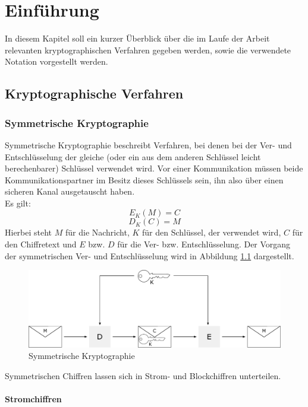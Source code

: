 \chapter{Einführung}

\label{cha_cryptographic_techniques}

In diesem Kapitel soll ein kurzer Überblick über die im Laufe der Arbeit relevanten kryptographischen Verfahren gegeben werden, sowie die verwendete Notation vorgestellt werden.

\section{Kryptographische Verfahren}

\subsection{Symmetrische Kryptographie}

Symmetrische Kryptographie beschreibt Verfahren, bei denen bei der Ver- und Entschlüsselung der gleiche (oder ein aus dem anderen Schlüssel leicht berechenbarer) Schlüssel verwendet wird. Vor einer Kommunikation müssen beide Kommunikationspartner im Besitz dieses Schlüssels sein, ihn also über einen sicheren Kanal ausgetauscht haben.\\
Es gilt:
\[E_K(M)=C\] 
\[D_K(C)=M\] 
Hierbei steht \(M\) für die Nachricht, \(K\) für den Schlüssel, der verwendet wird, \(C\) für den Chiffretext und \(E\) bzw. \(D\) für die Ver- bzw. Entschlüsselung. Der Vorgang der symmetrischen Ver- und Entschlüsselung wird in Abbildung \ref{fig_symmetric_encryption} dargestellt.

\begin{figure}
	\centering
	\includegraphics[width=15cm]{Diagrams/SymmetricEncryption.pdf} %
	\caption{Symmetrische Kryptographie}
	\label{fig_symmetric_encryption}
\end{figure}

Symmetrischen Chiffren lassen sich in Strom- und Blockchiffren unterteilen.

\subsubsection{Stromchiffren}

